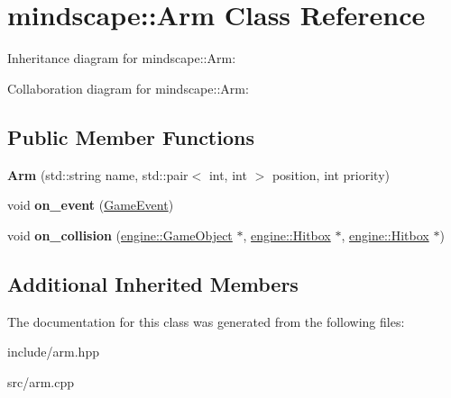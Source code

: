 \hypertarget{classmindscape_1_1_arm}{}\section{mindscape\+:\+:Arm Class Reference}
\label{classmindscape_1_1_arm}


Inheritance diagram for mindscape\+:\+:Arm\+:


Collaboration diagram for mindscape\+:\+:Arm\+:
\subsection*{Public Member Functions}
\begin{DoxyCompactItemize}
\item 
{\bfseries Arm} (std\+::string name, std\+::pair$<$ int, int $>$ position, int priority)\hypertarget{classmindscape_1_1_arm_a1fbc9ae5b007132b16ad08e1d3695aeb}{}\label{classmindscape_1_1_arm_a1fbc9ae5b007132b16ad08e1d3695aeb}

\item 
void {\bfseries on\+\_\+event} (\hyperlink{class_game_event}{Game\+Event})\hypertarget{classmindscape_1_1_arm_ae39e38ffd5567cd28202f51ee253b787}{}\label{classmindscape_1_1_arm_ae39e38ffd5567cd28202f51ee253b787}

\item 
void {\bfseries on\+\_\+collision} (\hyperlink{classengine_1_1_game_object}{engine\+::\+Game\+Object} $\ast$, \hyperlink{classengine_1_1_hitbox}{engine\+::\+Hitbox} $\ast$, \hyperlink{classengine_1_1_hitbox}{engine\+::\+Hitbox} $\ast$)\hypertarget{classmindscape_1_1_arm_ac30e41db231cbf4be054dbe89572264b}{}\label{classmindscape_1_1_arm_ac30e41db231cbf4be054dbe89572264b}

\end{DoxyCompactItemize}
\subsection*{Additional Inherited Members}


The documentation for this class was generated from the following files\+:\begin{DoxyCompactItemize}
\item 
include/arm.\+hpp\item 
src/arm.\+cpp\end{DoxyCompactItemize}
